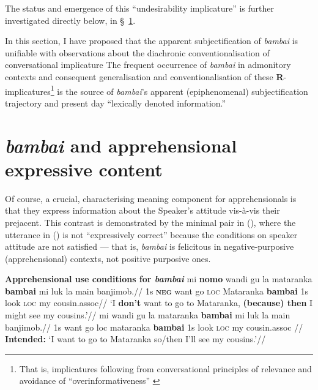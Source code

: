 \noindent The status and emergence of this ``undesirability implicature'' is further investigated directly below, in \S~\ref{bambai.expr}.


In this section, I have proposed that the apparent subjectification of \textit{bambai} is unifiable with observations about the diachronic conventionalisation of conversational implicature \citetext{\citealp[\textit{e.g.},][273\textit{ff}]{Cole1975} and especially Traugott's invited inferencing theory of semantic change (\citeyear{Traugott1980} \textit{et seq.})} The frequent occurrence of \textit{bambai} in admonitory contexts and consequent generalisation and conventionalisation of these \textbf{R}-implicatures\footnote{That is, implicatures following from conversational principles of relevance and avoidance of ``overinformativeness'' \citetext{\citealp{Horn1984} \textit{et seq.}}} is the source of \textit{bambai}'s apparent (epiphenomenal) subjectification trajectory and present day ``lexically denoted information.''

\section[Use conditions]{\textit{bambai} and apprehensional expressive content} \label{bambai.expr}


Of course, a crucial, characterising meaning component for apprehensionals is that they express information about the Speaker's attitude vis-à-vis their prejacent. This contrast is demonstrated by the minimal pair in (), where the utterance in () is not ``expressively correct'' \citep[\textit{cf.}][]{Kaplan1999} because the conditions on speaker attitude are not satisfied --- that is, \textit{bambai} is felicitous in negative-purposive (apprehensional) contexts, not positive purposive ones.



\pex \textbf{Apprehensional use conditions for \textit{bambai}}
\a\begingl%
\gla mi \textbf{nomo} wandi gu la mataranka \textbf{bambai} mi luk la main banjimob.//
\glb 1s \textbf{\textsc{neg}} want go \textsc{loc} Mataranka \textbf{bambai} 1s look \textsc{loc} my cousin.\gls{assoc}//
\glft`I \textbf{don't} want to go to Mataranka, \textbf{(because) then }I might see my cousins.'//\endgl
\a\begingl\gla{}mi wandi gu la mataranka \textbf{bambai} mi luk la main banjimob.//
\glb 1s want go {\sc loc} mataranka \textbf{bambai} 1s look \textsc{loc} my cousin.\gls{assoc}	//
\glft\textbf{Intended:} `I want to go to Mataranka so/then I'll see my cousins.'\trailingcitation{[AJ~072017]}//\endgl\xe





